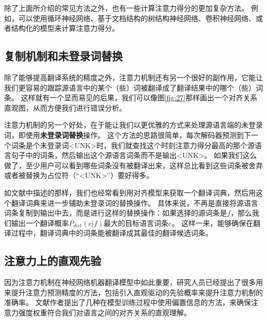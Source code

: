 \documentclass[10pt,a4paper]{ctexart}
\begin{document}
除了上面所介绍的常见方法之外，也有一些计算注意力得分的更加复杂方法。
例如，可以使用循环神经网络\cite{yang2016neural}、基于文档结构的树结构神经网络\cite{yang2016hierarchical}、卷积神经网络\cite{allamanis2016convolutional}、或者结构化的模型\cite{kim2017structured}来计算注意力得分。

\subsection{复制机制和未登录词替换}
除了能够提高翻译系统的精度之外，注意力机制还有另一个很好的副作用，它能让我们更容易的跟踪源语言中的某个（些）词被翻译成了翻译结果中的哪个（些）词条。
这样就有一个显而易见的后果，我们可以像图\ref{fig:27}那样画出一个对齐关系直观图，从而方便我们进行错误分析。

注意力机制的另一个好处，在于能让我们以更优雅的方式来处理源语言端的未登录词，即使用\textbf{未登录词替换}操作\cite{luong2014addressing}。
这个方法的思路很简单，每次解码器预测到下一个词条是个未登录词<UNK>时，我们就查找这个时刻注意力得分最高的那个源语言句子中的词条，然后输出这个源语言词条而不是输出<UNK>。
如果我们这么做了，至少用户可以看到哪些词条没有被翻译出来，这样总比看到这些词条被舍弃或者被替换为占位符（“<UNK>”）要好得多。

如文献\cite{brown1993mathematics}中描述的那样，我们也经常看到用对齐模型来获取一个翻译词典，然后用这个翻译词典来进一步辅助未登录词的替换操作。
具体来说，不再是直接将源语言词条复制到输出中去，而是进行这样的替换操作：如果选择的源词条是$f$，那么我们输出一个翻译概率$P_{dict}(e|f)$最大的目标语言词条$e$。
这样一来，能够确保在翻译过程中，翻译词典中的词条能被翻译成其最佳的翻译候选词条。

\subsection{注意力上的直观先验}
因为注意力机制在神经网络机器翻译模型中如此重要，研究人员已经提出了很多用来提升注意力预测精度的方法，包括引入直观驱动的先验概率来提升注意力机制的准确率。
文献\cite{cohn2016incorporating}作者提出了几种在模型训练过程中使用偏置信息的方法，来确保注意力强度权重符合我们对语言之间的对齐关系的直观理解。
\end{document}
